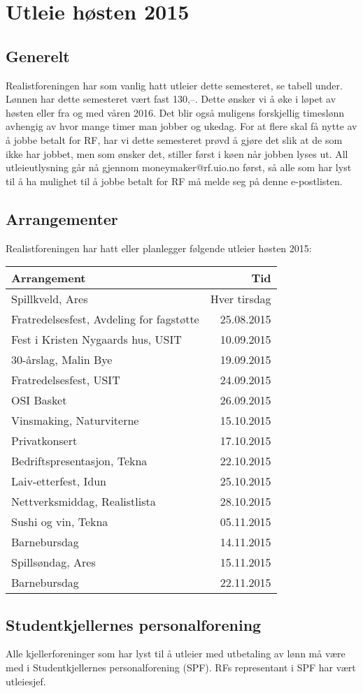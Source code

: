 \documentclass[12pt]{article}
\begin{document}
\pagestyle{fancy}
\fancyhf{}

\section*{Utleie høsten 2015}
\label{sec:1}
\subsection*{Generelt}
Realistforeningen har som vanlig hatt utleier dette semesteret, se tabell under.
Lønnen har dette semesteret vært fast 130,--. 
Dette ønsker vi å øke i løpet av høsten eller fra og med våren 2016.
Det blir også muligens forskjellig timeslønn avhengig av hvor
mange timer man jobber og ukedag.
For at flere skal få nytte av å jobbe betalt for RF,
har vi dette semesteret prøvd å gjøre det slik at de som ikke har jobbet,
men som ønsker det, stiller først i køen når jobben lyses ut.
All utleieutlysning går nå gjennom moneymaker@rf.uio.no først,
så alle som har lyst til å ha mulighet til å jobbe betalt for RF må
melde seg på denne e-postlisten.

\subsection*{Arrangementer}
Realistforeningen har hatt eller planlegger følgende utleier høsten 2015:\\

\begin{tabular}{l r}
\bfseries Arrangement & \bfseries Tid\\
\hline
Spillkveld, Ares &	Hver tirsdag\\
Fratredelsesfest, Avdeling for fagstøtte &	25.08.2015\\
Fest i Kristen Nygaards hus, USIT &	10.09.2015\\
30-årslag, Malin Bye &	19.09.2015\\
Fratredelsesfest, USIT & 24.09.2015\\
OSI Basket &	26.09.2015\\
Vinsmaking, Naturviterne &	15.10.2015\\
Privatkonsert &	17.10.2015\\
Bedriftspresentasjon, Tekna &	22.10.2015\\
Laiv-etterfest, Idun &	25.10.2015\\
Nettverksmiddag, Realistlista &	28.10.2015\\
Sushi og vin, Tekna &	05.11.2015\\
Barnebursdag &	14.11.2015\\
Spillsøndag, Ares &	15.11.2015\\
Barnebursdag &	22.11.2015
\end{tabular}
\subsection*{Studentkjellernes personalforening}
Alle kjellerforeninger som har lyst til å utleier med utbetaling av lønn
må være med i Studentkjellernes personalforening (SPF).
RFs representant i SPF har vært utleiesjef.
\end{document}
